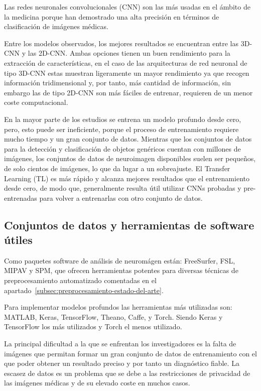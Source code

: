 Las redes neuronales convolucionales (CNN) son las más usadas en el ámbito de la medicina porque han demostrado una
alta precisión en términos de clasificación de imágenes médicas.

Entre los modelos observados, los mejores resultados se encuentran entre las 3D-CNN y las 2D-CNN. Ambas opciones tienen
un buen rendimiento para la extracción de características, en el caso de las  arquitecturas de red neuronal de tipo
3D-CNN estas muestran ligeramente un mayor rendimiento ya que recogen información tridimensional y, por tanto, más
cantidad de información, sin embargo  las de tipo 2D-CNN son más fáciles de entrenar, requieren de un menor coste
computacional.

En la mayor parte de los estudios se entrena un modelo profundo desde cero, pero, esto puede ser ineficiente, porque
el proceso de entrenamiento requiere mucho tiempo y un gran conjunto de datos.
Mientras que los conjuntos de datos para la detección y clasificación de objetos genéricos cuentan con millones de
imágenes, los conjuntos de datos de neuroimagen disponibles suelen ser pequeños, de solo cientos de imágenes, lo que da
lugar a un sobreajuste.
El Transfer Learning (TL) es más rápido y alcanza mejores resultados que el entrenamiento desde cero, de modo que,
generalmente resulta útil utilizar CNNs probadas y pre-entrenadas para volver a entrenarlas con otro conjunto de datos.

\subsection{Conjuntos de datos y herramientas de software útiles}\label{subsec:datos-y-herramientas-estado-del-arte}
Como paquetes software de análisis de neuromágen están: FreeSurfer, FSL, MIPAV y SPM, que ofrecen herramientas potentes
para diversas técnicas de preprocesamiento automatizado comentadas en el
apartado~\ref{subsec:preprocesamiento-estado-del-arte}.

Para implementar modelos profundos las herramientas más utilizadas son: MATLAB, Keras, TensorFlow, Theano, Caffe, y
Torch.
Siendo Keras y TensorFlow los más utilizados y Torch el menos utilizado.

La principal dificultad a la que se enfrentan los investigadores es la falta de imágenes que permitan formar un gran
conjunto de datos de entrenamiento con el que poder obtener un resultado preciso y por tanto un diagnóstico fiable.
La escasez de datos es un problema que se debe a las restricciones de privacidad de las imágenes médicas y de su elevado
coste en muchos casos.

